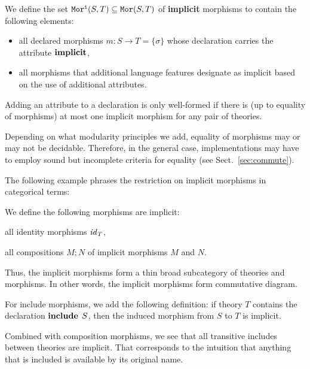 \begin{definition}
We define the set $\mathtt{Mor^i}(S,T)\subseteq\mathtt{Mor}(S,T)$ of \textbf{implicit} morphisms to contain the following elements:
\begin{itemize}
 \item all declared morphisms $m:S\to T=\{\sigma\}$ whose declaration carries the attribute $\operatorname{\mathbf{implicit}}$,
 \item all morphisms that additional language features designate as implicit based on the use of additional attributes.
\end{itemize}

Adding an attribute to a declaration is only well-formed if there is (up to equality of morphisms) at most one implicit morphism for any pair of theories.
\end{definition}

\begin{modexp}
Depending on what modularity principles we add, equality of morphisms may or may not be decidable.
Therefore, in the general case, implementations may have to employ sound but incomplete criteria for equality (see Sect.~\ref{sec:commute}).
\end{modexp}

\begin{modexp}
The following example phrases the restriction on implicit morphisms in categorical terms:
\begin{example}\label{impl:cat}
We define the following morphisms are implicit:
\begin{compactitem}
 \item all identity morphisms $\mathit{id}_{T}$,
 \item all compositions $M;N$ of implicit morphisms $M$ and $N$.
\end{compactitem}
Thus, the implicit morphisms form a thin broad subcategory of theories and morphisms.
In other words, the implicit morphisms form commutative diagram.
\end{example}
\end{modexp}

\begin{example}\label{impl:incl}
For include morphisms, we add the following definition: if theory $T$ contains the declaration $\operatorname{\mathbf{include}}{\;S}$, then the induced morphism from $S$ to $T$ is implicit.

Combined with composition morphisms, we see that all transitive includes between theories are implicit.
That corresponds to the intuition that anything that is included is available by its original name.
\end{example}

